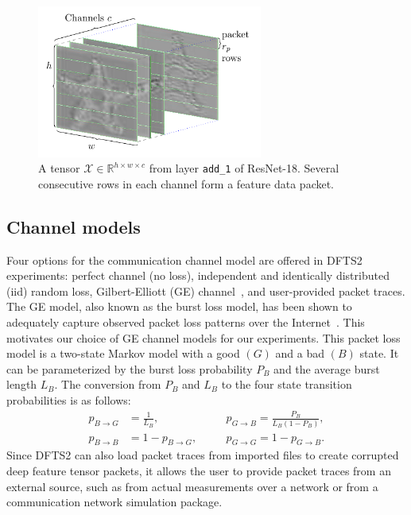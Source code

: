 \documentclass[conference,letterpaper]{IEEEtran}
\begin{document}
\begin{figure}
\centering
\includegraphics[width=7.4cm]{tensorlostviz3icip.pdf}
    \caption{A tensor $\mathcal{X} \in \mathbb{R}^{h \times w \times c}$ from layer \texttt{add\_1} of ResNet-18. Several consecutive rows in each channel form a feature data packet.}
    \label{fig:tensorviz}
\end{figure}

\subsection{Channel models} \label{subsec:description:channel}
Four options for the communication channel model are offered in DFTS2 experiments: perfect channel (no loss), independent and identically distributed (iid) random loss, Gilbert-Elliott (GE) channel~\cite{5755057}, and user-provided packet traces. The GE model, also known as the burst loss model, has been shown to adequately capture observed packet loss patterns over the Internet~\cite{5755057,stuhlmuller2000analysis}. This motivates our choice of GE channel models for our experiments. This packet loss model is a two-state Markov model with a good $(G)$ and a bad $(B)$ state. It can be parameterized by the burst loss probability $P_B$ and the average burst length $L_B$. The conversion from $P_B$ and $L_B$ to the four state transition probabilities is as follows:
\begin{equation}
\begin{alignedat}{2}
    p_{B\to G} & = \frac{1}{L_B},  \quad && p_{G\to B} = \frac{P_B}{L_B(1-P_B)},\\
    p_{B\to B} & =1-p_{B\to G}, \quad
    && p_{G\to G} = 1-p_{G\to B}.
\end{alignedat}
\end{equation} 
Since DFTS2 can also load packet traces from imported files to create corrupted deep feature tensor packets, it allows the user to provide packet traces from an external source, such as from actual measurements over a network or from a communication network simulation package.
\end{document}
